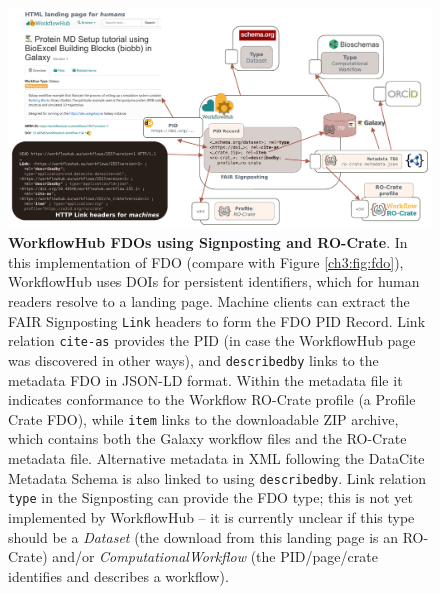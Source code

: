 \begin{figure}[htb]
  \includegraphics[width=\textwidth]{figures/ch09/signposting.pdf}
    \caption[WorkflowHub FDOs using Signposting and RO-Crate]{\textbf{WorkflowHub FDOs using Signposting and RO-Crate}. In this implementation of FDO (compare with Figure \vref{ch3:fig:fdo}), WorkflowHub uses DOIs for persistent identifiers, which for human readers resolve to a landing page. Machine clients can extract the FAIR Signposting \texttt{Link} headers \cite{Van de Sompel 2022} to form the FDO PID Record. Link relation \texttt{cite-as} provides the PID \cite{Bayarri 2022} (in case the WorkflowHub page was discovered in other ways), and \texttt{describedby} links to the metadata FDO in JSON-LD format. Within the metadata file it indicates conformance to the Workflow RO-Crate profile (a Profile Crate FDO), while \texttt{item} links to the downloadable ZIP archive, which contains both the Galaxy workflow files and the RO-Crate metadata file. Alternative metadata in XML following the DataCite Metadata Schema is also linked to using \texttt{describedby}. Link relation \texttt{type} in the Signposting can provide the FDO type; this is not yet implemented by WorkflowHub -- it is currently unclear if this type should be a \emph{Dataset} (the download from this landing page is an RO-Crate) and/or \emph{ComputationalWorkflow} (the PID/page/crate identifies and describes a workflow).
    }
  \label{ch9:fig:signposting}
\end{figure}
